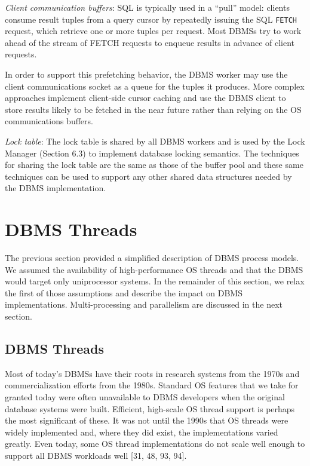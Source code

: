 \documentclass[a4paper,11pt,twoside,openright]{book}
\begin{document}
\emph{Client communication buffers}: SQL is typically used in a ``pull''
model: clients consume result tuples from a query cursor by repeatedly
issuing the SQL \texttt{FETCH} request, which retrieve one or more tuples per
request. Most DBMSs try to work ahead of the stream of FETCH requests to
enqueue results in advance of client requests.

In order to support this prefetching behavior, the DBMS worker may use
the client communications socket as a queue for the tuples it produces.
More complex approaches implement client-side cursor caching and use the
DBMS client to store results likely to be fetched in the near future
rather than relying on the OS communications buffers.

\emph{Lock table}: The lock table is shared by all DBMS workers and is
used by the Lock Manager (Section 6.3) to implement database locking
semantics. The techniques for sharing the lock table are the same as
those of the buffer pool and these same techniques can be used to
support any other shared data structures needed by the DBMS
implementation.

\hypertarget{dbms-threads}{%
\section{DBMS Threads}\label{dbms-threads}}

The previous section provided a simplified description of DBMS process
models. We assumed the availability of high-performance OS threads and
that the DBMS would target only uniprocessor systems. In the remainder
of this section, we relax the first of those assumptions and describe
the impact on DBMS implementations. Multi-processing and parallelism are
discussed in the next section.

\hypertarget{dbms-threads-1}{%
\subsection{DBMS Threads}\label{dbms-threads-1}}

Most of today's DBMSs have their roots in research systems from the
1970s and commercialization efforts from the 1980s. Standard OS features
that we take for granted today were often unavailable to DBMS developers
when the original database systems were built. Efficient, high-scale OS
thread support is perhaps the most significant of these. It was not
until the 1990s that OS threads were widely implemented and, where they
did exist, the implementations varied greatly. Even today, some OS
thread implementations do not scale well enough to support all DBMS
workloads well {[}31, 48, 93, 94{]}.
\end{document}
